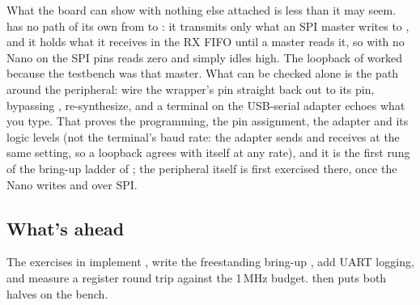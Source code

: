 What the board can show with nothing else attached is less than it may seem.  has no
path of its own from  to : it transmits only what an SPI master writes to
, and it holds what it receives in the RX FIFO until a master reads it, so with no
Nano on the SPI pins  reads zero and  simply idles high. The loopback of
 worked because the testbench was that master. What can be checked alone is the
path around the peripheral: wire the wrapper's  pin straight back out to its  pin,
bypassing , re-synthesize, and a terminal on the USB-serial adapter echoes what you
type. That proves the programming, the pin assignment, the adapter and its logic levels
(not the terminal's baud rate: the adapter sends and receives at the same setting, so a loopback agrees with itself at any rate), and it is the first rung of the bring-up ladder of ; the peripheral
itself is first exercised there, once the Nano writes  and  over SPI.

\subsection{What's ahead}
The exercises in  implement , write the freestanding bring-up
, add UART logging, and measure a register round trip against the 1\,MHz 
budget.  then puts both halves on the bench.
